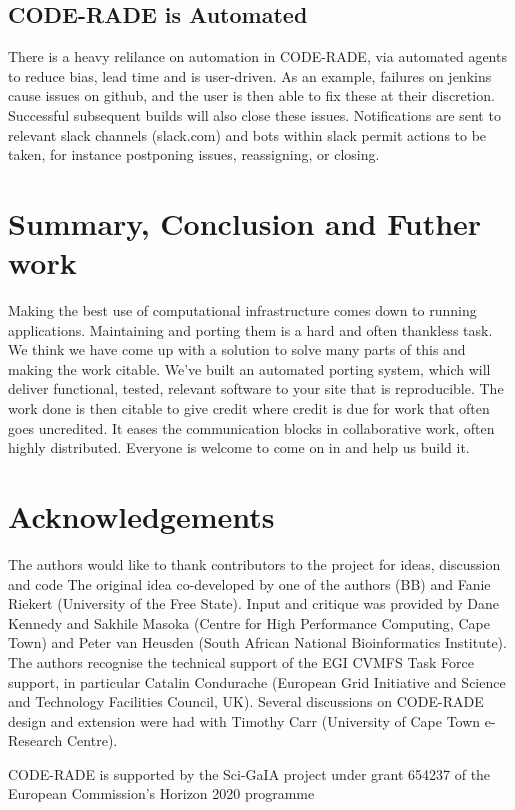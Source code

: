 \documentclass[a4paper]{jpconf}
\begin{document}
\subsection{CODE-RADE is Automated}

There is a heavy relilance on automation in CODE-RADE, via automated agents to reduce bias, lead time
and is user-driven.
As an example, failures on jenkins cause issues on github, and the user is then able to fix these at
their discretion.
Successful subsequent builds will also close these issues.
Notifications are sent to relevant slack channels (slack.com) and bots within slack permit actions
to be taken, for instance postponing issues, reassigning, or closing.

\section{Summary, Conclusion and Futher work}

Making the best use of computational infrastructure comes down to running applications.
Maintaining and porting them is a hard and often thankless task.
We think we have come up with a solution to solve many parts of this and making the work citable.
We've built an automated porting system, which will deliver functional, tested, relevant software to
your site that is reproducible. The work done is then citable to give credit where credit is due for work
that often goes uncredited.
It eases the communication blocks in collaborative work, often highly distributed.
Everyone is welcome to come on in and help us build it.

\section*{Acknowledgements}
The authors would like to thank contributors to the project for ideas, discussion and code
The original idea co-developed by one of the authors (BB) and Fanie Riekert (University of the Free
State). Input and critique was provided  by Dane Kennedy and Sakhile Masoka (Centre for High
Performance Computing, Cape Town) and Peter van Heusden (South African National Bioinformatics
Institute). The authors recognise the technical support of the EGI CVMFS Task Force support, in
particular Catalin Condurache (European Grid Initiative and Science and Technology Facilities
Council, UK). Several discussions on CODE-RADE design and extension were had with Timothy Carr
(University of Cape Town e-Research Centre).

CODE-RADE is supported by the Sci-GaIA project under grant 654237 of the European Commission's
Horizon 2020 programme
\end{document}
